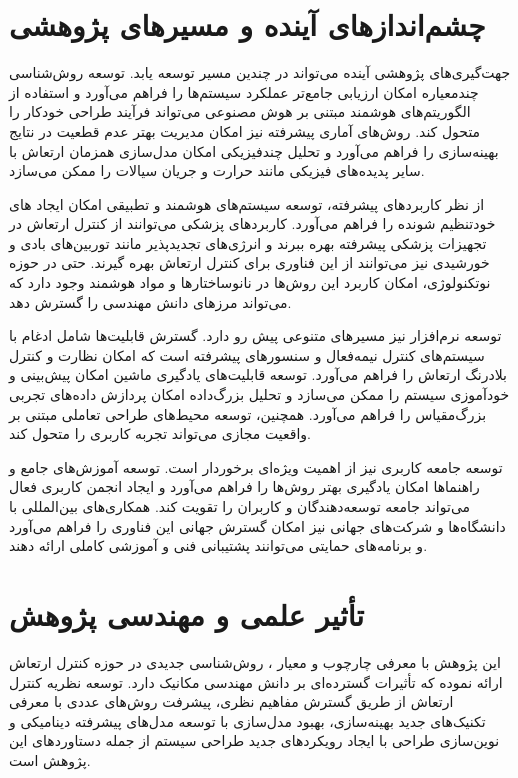 \section{چشم‌اندازهای آینده و مسیرهای پژوهشی}

جهت‌گیری‌های پژوهشی آینده می‌تواند در چندین مسیر توسعه یابد. توسعه روش‌شناسی چندمعیاره امکان ارزیابی جامع‌تر عملکرد سیستم‌ها را فراهم می‌آورد و استفاده از الگوریتم‌های هوشمند مبتنی بر هوش مصنوعی می‌تواند فرآیند طراحی خودکار را متحول کند. روش‌های آماری پیشرفته نیز امکان مدیریت بهتر عدم قطعیت در نتایج بهینه‌سازی را فراهم می‌آورد و تحلیل چندفیزیکی امکان مدل‌سازی همزمان ارتعاش با سایر پدیده‌های فیزیکی مانند حرارت و جریان سیالات را ممکن می‌سازد.

از نظر کاربردهای پیشرفته، توسعه سیستم‌های هوشمند و تطبیقی امکان ایجاد های خودتنظیم شونده را فراهم می‌آورد. کاربردهای پزشکی می‌توانند از کنترل ارتعاش در تجهیزات پزشکی پیشرفته بهره ببرند و انرژی‌های تجدیدپذیر مانند توربین‌های بادی و خورشیدی نیز می‌توانند از این فناوری برای کنترل ارتعاش بهره گیرند. حتی در حوزه نوتکنولوژی، امکان کاربرد این روش‌ها در نانوساختارها و مواد هوشمند وجود دارد که می‌تواند مرزهای دانش مهندسی را گسترش دهد.

توسعه نرم‌افزار  نیز مسیرهای متنوعی پیش رو دارد. گسترش قابلیت‌ها شامل ادغام با سیستم‌های کنترل نیمه‌فعال و سنسورهای پیشرفته است که امکان نظارت و کنترل بلادرنگ ارتعاش را فراهم می‌آورد. توسعه قابلیت‌های یادگیری ماشین امکان پیش‌بینی و خودآموزی سیستم را ممکن می‌سازد و تحلیل بزرگ‌داده امکان پردازش داده‌های تجربی بزرگ‌مقیاس را فراهم می‌آورد. همچنین، توسعه محیط‌های طراحی تعاملی مبتنی بر واقعیت مجازی می‌تواند تجربه کاربری را متحول کند.

توسعه جامعه کاربری نیز از اهمیت ویژه‌ای برخوردار است. توسعه آموزش‌های جامع و راهنماها امکان یادگیری بهتر روش‌ها را فراهم می‌آورد و ایجاد انجمن کاربری فعال می‌تواند جامعه توسعه‌دهندگان و کاربران را تقویت کند. همکاری‌های بین‌المللی با دانشگاه‌ها و شرکت‌های جهانی نیز امکان گسترش جهانی این فناوری را فراهم می‌آورد و برنامه‌های حمایتی می‌توانند پشتیبانی فنی و آموزشی کاملی ارائه دهند.

\section{تأثیر علمی و مهندسی پژوهش}

این پژوهش با معرفی چارچوب  و معیار ، روش‌شناسی جدیدی در حوزه کنترل ارتعاش ارائه نموده که تأثیرات گسترده‌ای بر دانش مهندسی مکانیک دارد. توسعه نظریه کنترل ارتعاش از طریق گسترش مفاهیم نظری، پیشرفت روش‌های عددی با معرفی تکنیک‌های جدید بهینه‌سازی، بهبود مدل‌سازی با توسعه مدل‌های پیشرفته دینامیکی و نوین‌سازی طراحی با ایجاد رویکردهای جدید طراحی سیستم از جمله دستاوردهای این پژوهش است.

